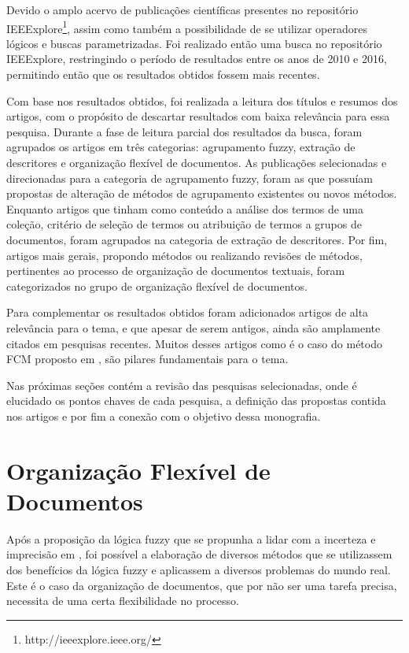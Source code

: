 Devido o amplo acervo de publicações científicas presentes no repositório 
IEEExplore\footnote{http://ieeexplore.ieee.org/}, assim como também a possibilidade de se utilizar
operadores lógicos e buscas parametrizadas. Foi realizado então uma busca no repositório 
IEEExplore, restringindo o período de resultados entre os anos de 2010 e 2016, permitindo então que 
os resultados obtidos fossem mais recentes.

Com base nos resultados obtidos, foi realizada a leitura dos títulos e resumos
dos artigos, com o propósito de descartar resultados com baixa relevância para essa pesquisa.
Durante a fase de leitura parcial dos resultados da busca, foram agrupados os artigos em 
três categorias: agrupamento fuzzy, extração de descritores e organização flexível de documentos.
As publicações selecionadas e direcionadas para a categoria de agrupamento fuzzy, foram as que
possuíam propostas de alteração de métodos de agrupamento existentes ou novos métodos. Enquanto
artigos que tinham como conteúdo a análise dos termos de uma coleção, critério de seleção de termos
ou atribuição de termos a grupos de documentos, foram agrupados na categoria de extração de 
descritores. Por fim, artigos mais gerais, propondo métodos ou realizando revisões de métodos,
pertinentes ao processo de organização de documentos textuais, foram categorizados no grupo 
de organização flexível de documentos.

Para complementar os resultados obtidos foram adicionados artigos de alta relevância para o tema,
e que apesar de serem antigos, ainda são amplamente citados em pesquisas recentes. Muitos desses
artigos como é o caso do método FCM proposto em \cite{Bezdek1984}, são pilares fundamentais para
o tema.

Nas próximas seções contém a revisão das pesquisas selecionadas, onde é elucidado os pontos
chaves de cada pesquisa, a definição das propostas contida nos artigos e por fim a conexão com o 
objetivo dessa monografia.

\section{Organização Flexível de Documentos}

Após a proposição da lógica fuzzy que se propunha a lidar com a incerteza e imprecisão em 
\cite{Zadeh1965}, foi possível a elaboração de diversos métodos que se utilizassem dos benefícios
da lógica fuzzy e aplicassem a diversos problemas do mundo real. Este é o caso da organização
de documentos, que por não ser uma tarefa precisa, necessita de uma certa flexibilidade no 
processo.

